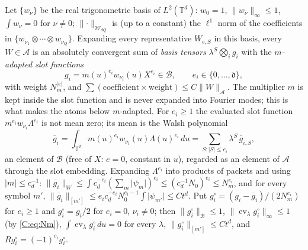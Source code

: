 \documentclass[11pt]{article}
\DeclareMathOperator{\ev}{ev}
\newcommand{\Torus}{\mathbb{T}}
\newcommand{\cW}{\mathcal{W}}
\newcommand{\cA}{\mathcal{A}}
\newcommand{\cB}{\mathcal{B}}
\newcommand{\norm}[1]{\lVert #1\rVert}
\newcommand{\abs}[1]{\lvert #1\rvert}
\newcommand{\dg}{\mathfrak{d}}
\begin{document}
Let \(\{w_\nu\}\) be the real trigonometric basis of \(L^2(\Torus^d)\):
\(w_0=1\), \(\norm{w_\nu}_\infty\le1\), \(\int w_\nu=0\) for \(\nu\ne0\);
\(\norm\cdot_{\cW_{dQ}}\) is (up to a constant) the \(\ell^1\) norm of the
coefficients in \(\{w_{\nu_1}\otimes\cdots\otimes w_{\nu_Q}\}\).  Expanding
every representative \(W_{e,S}\) in this basis, every \(W\in\cA\) is an
absolutely convergent sum of \emph{basis tensors}
\(\lambda^S\bigotimes_ig_i\) with the \emph{\(m\)-adapted slot functions}
\[
 g_i=m(u)^{e_i}w_{\nu_i}(u)X^{e_i}\in\cB,\qquad e_i\in\{0,\dots,\dg\},
\]
with weight \(N_m^{\abs e}\), and \(\sum(\text{coefficient}\times\text{weight})\le C\norm W_\cA\).
The multiplier \(m\) is kept inside the slot function and is never
expanded into Fourier modes; this is what makes the atoms below
\(m\)-adapted.  For \(e_i\ge1\) the evaluated slot function
\(m^{e_i}w_{\nu_i}\Lambda^{e_i}\) is not mean zero; its mean is the Walsh
polynomial
\begin{equation}
 \overline g_i=\int_{\Torus^d}m(u)^{e_i}w_{\nu_i}(u)\Lambda(u)^{e_i}\,du
 =\sum_{S:\abs S\le e_i}\lambda^S\,\overline g_{i,S},
 \label{C:eq:centring}
\end{equation}
an element of \(\cB\) (free of \(X\): \(e=0\), constant in \(u\)), regarded
as an element of \(\cA\) through the slot embedding.  Expanding
\(\Lambda^{e_i}\) into products of packets and using \(\abs m\le c_d^{-1}\):
\(\norm{\overline g_i}_W\le\int c_d^{-e_i}(\sum_m\abs{\psi_m})^{e_i}\le(c_d^{-1}N_0)^{e_i}\le N_m^{e_i}\),
and for every symbol \(m'\),
\(\norm{\overline g_i}_{[m']}\le e_ic_d^{-e_i}N_0^{e_i-1}\int\abs{\psi_{m'}}\le Ct^d\).
Put \(g^\circ_i=(g_i-\overline g_i)/(2N_m^{e_i})\) for \(e_i\ge1\) and
\(g^\circ_i=g_i/2\) for \(e_i=0\), \(\nu_i\ne0\); then
\(\norm{g^\circ_i}_\cB\le1\), \(\norm{\ev_\lambda g^\circ_i}_\infty\le1\)
(by \eqref{C:eq:Nm}), \(\int\ev_\lambda g^\circ_i\,du=0\) for every
\(\lambda\), \(\norm{g^\circ_i}_{[m']}\le Ct^d\), and
\(Rg^\circ_i=(-1)^{e_i}g^\circ_i\).
\end{document}
